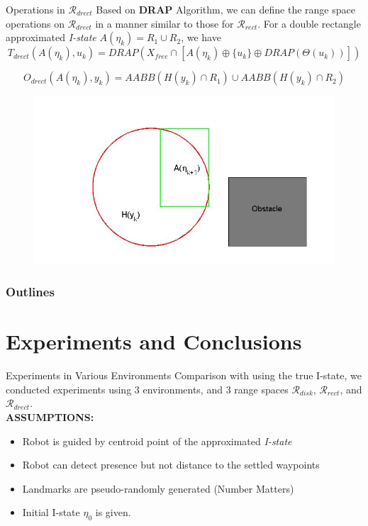 \begin{frame}{Operations in $\mathcal{R}_{drect}$}
  Based on \textbf{DRAP} Algorithm, we can define the range space operations on
  $\mathcal{R}_{drect}$ in a manner similar to those for $\mathcal{R}_{rect}$.
  For a double rectangle approximated \emph{I-state} $A(\eta_k) = R_1 \cup R_2$,
  we have
  $$ T_{drect}(A(\eta_k), u_k) = DRAP(X_{free} \cap [A(\eta_k) \oplus \{ u_k \} \oplus DRAP(\Theta(u_k))])$$

  $$O_{drect}(A(\eta_k), y_k) = AABB(H(y_k) \cap R_1)\cup AABB(H(y_k) \cap R_2)$$
  \begin{figure}
    \includegraphics[scale=0.3]{figs/drectevolve5.jpg}
  \end{figure}
\end{frame}

\begin{frame}
  \frametitle{Outlines}
  \tableofcontents[]
\end{frame}

\section[Experiments]{Experiments and Conclusions}
\begin{frame}{Experiments in Various Environments}
  Comparison with using the true I-state, we conducted experiments using 3
  environments, and 3 range spaces $\mathcal{R}_{disk}$, $\mathcal{R}_{rect}$,
  and  $\mathcal{R}_{drect}$. \\
  \textbf{ASSUMPTIONS:}\\
  \begin{itemize}
  \item Robot is guided by centroid point of the approximated \emph{I-state}
  \item Robot can detect presence but not distance to the settled waypoints
  \item Landmarks are pseudo-randomly generated (Number Matters)
  \item Initial I-state $\eta_0$ is given.
  \end{itemize}    
\end{frame}

